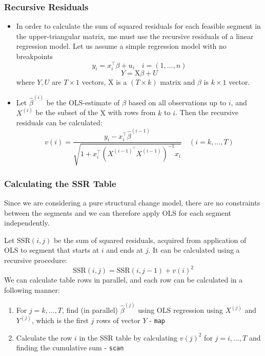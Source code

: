 \documentclass[presentation.tex]{subfiles}
\begin{document}
\begin{frame}
  \frametitle{Recursive Residuals}
  \begin{itemize}
  \item 
In order to calculate the sum of squared residuals for each feasible segment in
the upper-triangular matrix, me must use the recursive residuals of a linear
regression model. Let us assume a simple regression model with no breakpoints
\[
y_i = x_i^{\top} \beta + u_i \quad i = (1, \hdots, n)
\]
\[
Y = \mathrm{X}\beta + U
\]
where $Y, U$ are $T \times 1$ vectors, $\mathrm{X}$ is a $(T \times k)$ matrix
and $\beta$ is $k \times 1$ vector.

\item 
Let $\hat{\beta}^{(i)}$ be the OLS-estimate of $\beta$
based on all observations up to $i$, and $X^{(i)}$ be the subset of the
$\mathrm{X}$ with rows from $k$ to $i$.
Then the recursive residuals can be calculated:
\[
v(i)=\frac{y_{i}-x_{i}^{\top}
  \hat{\beta}^{(i-1)}}{\sqrt{1+x_{i}^{\top}\left(X^{(i-1)^{\top}}
    X^{(i-1)}\right)^{-1} x_{i}}} \quad(i=k, \ldots, T)
\]
  \end{itemize}
\end{frame}

\begin{frame}[fragile]
  \frametitle{Calculating the SSR Table}
Since we are considering a pure
structural change model, there are no constraints between the segments and we
can therefore apply OLS for each segment independently.

Let $\text{SSR}(i, j)$  be the sum of squared residuals, acquired from
application of OLS to segment that starts at $i$ and ends at $j$.
It can be calculated using a recursive procedure:
\[
\text{SSR}(i,j) = \text{SSR}(i, j - 1) + v(i)^2
\]
We can calculate table rows in parallel, and each row can be calculated
in a following manner:
\begin{enumerate}
\item For $j = k, \hdots, T$, find (in parallel) $\hat{\beta}^{(j)}$ using OLS regression
  using $X^{(j)}$ and $Y^{(j)}$, which is the first $j$ rows of vector $Y$ - \texttt{map}
\item Calculate the row $i$ in the SSR table by calculating $v(j)^2$ for $j = i, \hdots, T$
  and finding the cumulative sum -  \texttt{scan}
\end{enumerate}
\end{frame}
\end{document}
